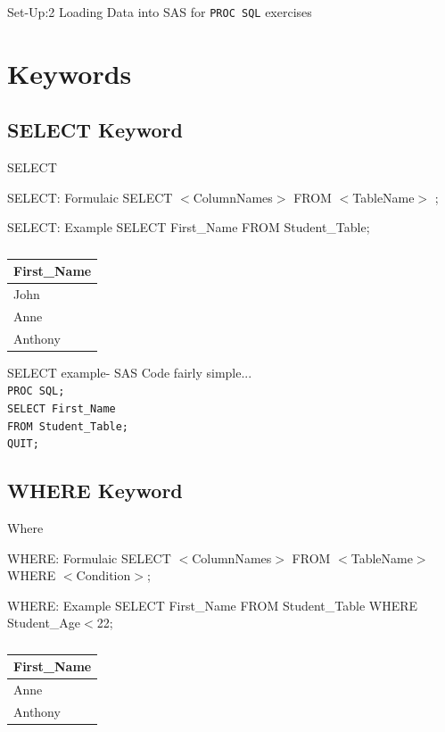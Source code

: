 \documentclass[handout]{beamer}
\begin{document}
\begin{frame}{Set-Up:2}
	Loading Data into SAS for \texttt{PROC SQL} exercises
\end{frame}
	
	\section{Keywords}
	
	\subsection{SELECT Keyword}
	\begin{frame}{SELECT}
		\begin{block}{SELECT: Formulaic}
			SELECT $<$ColumnNames$>$ FROM $<$TableName$>$ ;
		\end{block}
		\begin{block}{SELECT: Example}
			SELECT First\_Name FROM Student\_Table;
		\end{block}
\begin{table}[H]
	\centering
	\caption*{}

	\begin{tabular}{|l|}
		\hline
		 First\_Name  \\ \hline
			John \\ \hline
			Anne  \\ \hline
			Anthony  \\    \hline
	\end{tabular}
\end{table}			
	\end{frame}
	
	\begin{frame}{SELECT example- SAS}
		Code fairly simple... \\ \pause 
		\texttt{PROC SQL;} \\
		\texttt{SELECT First\_Name } \\
		\texttt{FROM Student\_Table;}\\
		\texttt{QUIT;}
	\end{frame}
	
	\subsection{WHERE Keyword}
	\begin{frame}{Where}
		\begin{block}{WHERE: Formulaic}
			SELECT $<$ColumnNames$>$ FROM $<$TableName$>$ 
			WHERE $<$Condition$>$;
		\end{block}
		\begin{block}{WHERE: Example}
			SELECT First\_Name FROM Student\_Table 
			WHERE Student\_Age$<$22;
		\end{block}
	\begin{table}[H]
	\centering
	\caption*{}

	\begin{tabular}{|l|}
		\hline
		First\_Name  \\ \hline
		Anne  \\ \hline
		Anthony  \\    \hline
	\end{tabular}
	\end{table}		
	\end{frame}
	
\end{document}
